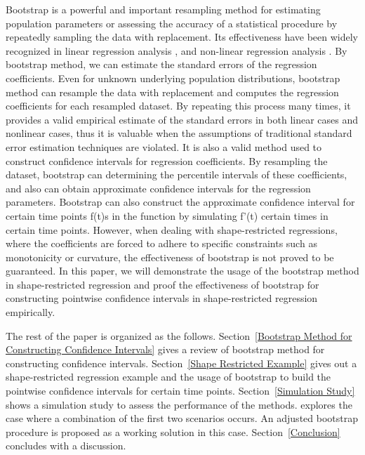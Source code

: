 \documentclass[12pt]{article}
\begin{document}
Bootstrap is a powerful and important resampling method for estimating population
parameters or assessing the accuracy of a statistical procedure by repeatedly 
sampling the data with replacement. Its effectiveness have been widely recognized
in linear regression analysis \cite{efron1979bootstrap}, and non-linear regression
analysis \cite{davidson1999bootstrap}. By bootstrap method, we can estimate the 
standard errors of the regression coefficients. Even for unknown underlying 
population distributions, bootstrap method can resample the data with replacement 
and computes the regression coefficients for each resampled dataset. 
\cite{hall2013simple}By repeating this process many times, it provides a valid 
empirical estimate of the standard errors in both linear cases 
\cite{efron1985bootstrap} and nonlinear cases\cite{wong2019bootstrap}, thus it is
valuable when the assumptions of traditional standard error estimation techniques 
are violated. It is also a valid method used to construct confidence intervals for
regression coefficients. \cite{efron1985bootstrap}By resampling the dataset, 
bootstrap can determining the percentile intervals of these coefficients, and also
can obtain approximate confidence intervals for the regression parameters. 
\cite{cui2012evaluating} Bootstrap can also construct the approximate confidence 
interval for certain time points f(t)s in the function by simulating f'(t) certain
times in certain time points. \cite{horowitz2018bootstrap} However, when dealing 
with shape-restricted regressions, where the coefficients are forced to adhere to 
specific constraints such as monotonicity or curvature, the effectiveness of 
bootstrap is not proved to be guaranteed. In this paper, we will demonstrate the
usage of the bootstrap method in shape-restricted regression and proof the 
effectiveness of bootstrap for constructing pointwise confidence intervals in 
shape-restricted regression empirically.


The rest of the paper is organized as the follows. 
Section~\ref{Bootstrap Method for Constructing Confidence Intervals}
gives a review of bootstrap method for constructing confidence intervals. 
Section~\ref{Shape Restricted Example} gives out a shape-restricted regression
example and the usage of bootstrap to build the pointwise confidence intervals 
for certain time points. Section~\ref{Simulation Study} shows a simulation study
to assess the performance of the methods.
explores the case where a combination of the first two scenarios occurs. An  
adjusted bootstrap procedure is proposed as a working solution in this case.  
Section~\ref{Conclusion} concludes with a discussion.
\end{document}
